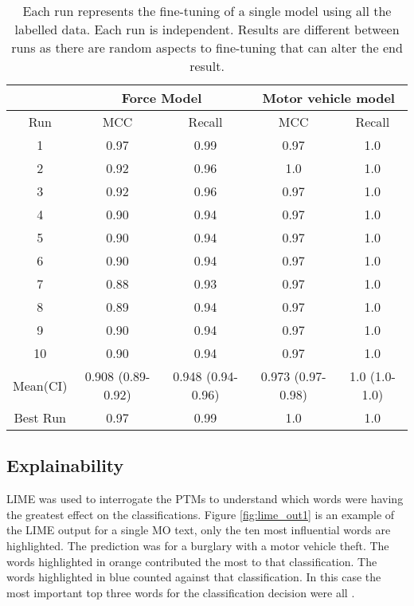\begin{table}[]
\begin{tabular}{@{}ccccc@{}}
\toprule
\multicolumn{1}{l}{} & \multicolumn{2}{c}{Force Model}       & \multicolumn{2}{c}{Motor vehicle model} \\\midrule
Run                  & MCC               & Recall            & MCC                & Recall   \\\midrule
1                    & 0.97              & 0.99              & 0.97               & 1.0        \\
2                    & 0.92              & 0.96              & 1.0                  & 1.0        \\
3                    & 0.92              & 0.96              & 0.97               & 1.0        \\
4                    & 0.90               & 0.94              & 0.97               & 1.0        \\
5                    & 0.90               & 0.94              & 0.97               & 1.0        \\
6                    & 0.90               & 0.94              & 0.97               & 1.0        \\
7                    & 0.88              & 0.93              & 0.97               & 1.0        \\
8                    & 0.89              & 0.94              & 0.97               & 1.0        \\
9                    & 0.90               & 0.94              & 0.97               & 1.0        \\
10                   & 0.90               & 0.94              & 0.97               & 1.0        \\\midrule
Mean(CI)             & 0.908 (0.89-0.92) & 0.948 (0.94-0.96) & 0.973 (0.97-0.98)  & 1.0 (1.0-1.0)  \\\midrule
Best Run             & 0.97              & 0.99              & 1.0                  & 1.0        \\ \bottomrule
\end{tabular}
\caption[Model metrics. PF1 data. Force used and motor vehicle stolen models]{\label{tab:final-model} Each run represents the fine-tuning of a single model using all the labelled data. Each run is independent. Results are different between runs as there are random aspects to fine-tuning that can alter the end result. }
\end{table}

\subsection{Explainability} LIME was used to interrogate the PTMs to understand which words were having the greatest effect on the classifications. Figure \ref{fig:lime_out1} is an example of the LIME output for a single MO text, only the ten most influential words are highlighted.  The prediction was for a burglary with a motor vehicle theft. The words highlighted in orange contributed the most to that classification. The words highlighted in blue counted against that classification. In this case the most important top three words for the classification decision were all . 

